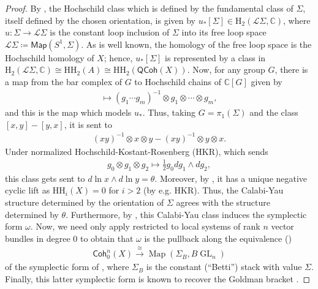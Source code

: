 \documentclass{article}
\numberwithin{equation}{section}
\theoremstyle{quest}
\theoremstyle{definition}
\theoremstyle{remark}
\DeclareMathOperator{\GL}{GL}
\DeclareMathOperator{\Map}{Map}
\begin{document}
\begin{proof}
	By \cite[Proposition 5.3]{BD1}, the Hochschild class which is defined by the fundamental class of $\Sigma$, itself defined by the chosen orientation, is given by $u_*[\Sigma]\in \mathrm H_2(\mathscr{L}\Sigma, \mathbb{C} )$, where $u:\Sigma \to \mathscr{L}\Sigma$ is the constant loop inclusion of $\Sigma$ into its free loop space $\mathscr{L}\Sigma\coloneqq \mathsf{Map}(S^1,\Sigma)$. As is well known, the homology of the free loop space is the Hochschild homology of $X$; hence, $u_*[\Sigma]$ is represented by a class in $\mathrm H_2(\mathscr{L}\Sigma,\mathbb{C} )\cong \mathrm H\mathrm H_2(A)\cong \mathrm H\mathrm H_2(\mathsf{QCoh}(X))$. Now, for any group $G$, there is a map from the bar complex of $G$ to Hochschild chains of $\mathbb{C} [G]$ given by
	\begin{align*}
		[g_1,\ldots,g_m]\mapsto (g_1\cdots g_m)^{-1}\otimes g_1\otimes \cdots \otimes g_m,
	\end{align*} 
	and this is the map which models $u_*$. Thus, taking $G=\pi_1(\Sigma)$ and the class $[x,y]-[y,x]$, it is sent to
	\begin{align*}
		(xy)^{-1}\otimes x\otimes y-(xy)^{-1}\otimes y\otimes x.
	\end{align*} 
	Under normalized Hochschild-Kostant-Rosenberg (HKR), which sends
	\begin{align*}
		g_0\otimes g_1\otimes g_2\mapsto \frac{1}{2}g_0dg_1\wedge dg_2,
	\end{align*} 
	this class gets sent to $d\ln x\wedge d\ln y=\theta$. Moreover, by \cite[Lemma 5.10]{BD1}, it has a unique negative cyclic lift as $\mathrm H\mathrm H_i(X)=0$ for $i>2$ (by e.g. HKR). Thus, the Calabi-Yau structure determined by the orientation of $\Sigma$ agrees with the structure determined by $\theta$. Furthermore, by \cite[Theorem 5.5]{BD}, this Calabi-Yau class induces the symplectic form $\omega$. Now, we need only apply \cite[Lemma 3.7]{BD-is-PTVV} restricted to local systems of rank $n$ vector bundles in degree 0 to obtain that $\omega$ is the pullback along the equivalence (\cite[Corollary A.1]{BRY})
	\begin{align*}
		\mathsf{Coh}^n_0(X)\xrightarrow{\cong}\Map(\Sigma_B,B\GL_n)
	\end{align*} 
	of the symplectic form of \cite[Theorem 2.5]{PTVV}, where $\Sigma_B$ is the constant (``Betti'') stack with value $\Sigma$. Finally, this latter symplectic form is known to recover the Goldman bracket \cite[Section 3.1]{PTVV}.
\end{proof} 





\newpage
\printbibliography[heading=bibintoc]
\end{document}
